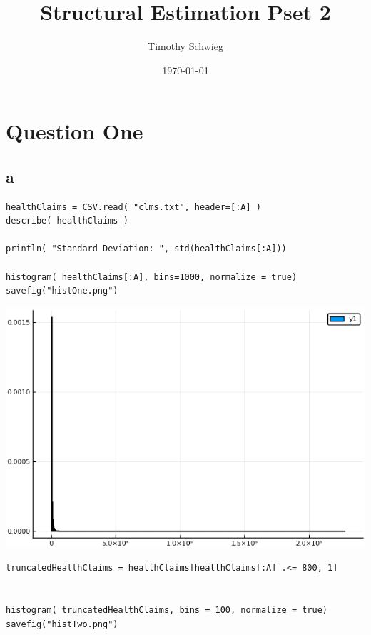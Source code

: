 \documentclass[12pt, letterpaper]{paper}
\author{Timothy Schwieg}
\date{\today}
\title{Structural Estimation Pset 2}
\begin{document}
\maketitle

\section{Question One}
\label{sec:org29dab38}
\subsection{a}
\label{sec:orged21076}
\begin{verbatim}
healthClaims = CSV.read( "clms.txt", header=[:A] )
describe( healthClaims )

println( "Standard Deviation: ", std(healthClaims[:A]))

histogram( healthClaims[:A], bins=1000, normalize = true)
savefig("histOne.png")
\end{verbatim}

\begin{center}
\includegraphics[width=.9\linewidth]{histOne.png}
\end{center}

\begin{verbatim}
truncatedHealthClaims = healthClaims[healthClaims[:A] .<= 800, 1]


histogram( truncatedHealthClaims, bins = 100, normalize = true)
savefig("histTwo.png")
\end{verbatim}
\end{document}
